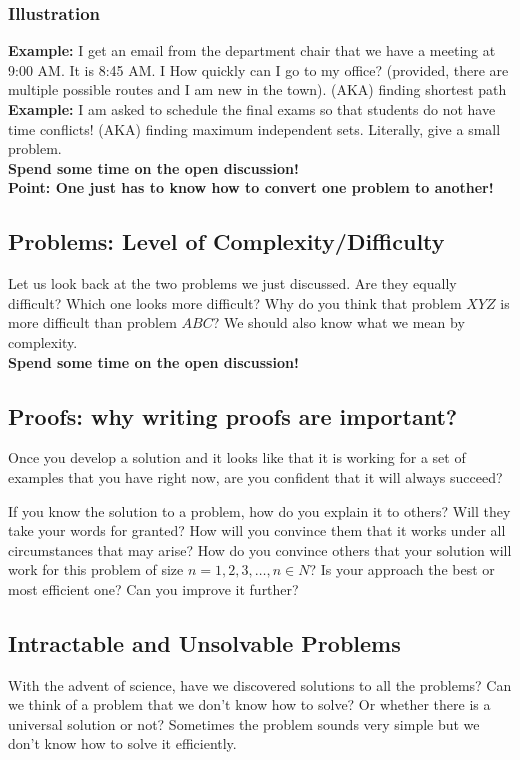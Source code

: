 \documentclass[11pt, oneside]{article}   	%
\begin{document}
\subsubsection{Illustration}
{\bf Example:} I get an email from the department chair that we have a meeting at 9:00 AM. It is 8:45 AM. I How quickly can I go to my office? (provided, there are multiple possible routes and I am new in the town).  
(AKA) finding shortest path\\

{\bf Example:} I am asked to schedule the final exams so that students do not have time conflicts!
(AKA) finding maximum independent sets. Literally, give a small problem.\\
{\bf Spend some time on the open discussion!}\\

{\bf Point: One just has to know how to convert one problem to another!}

\subsection{Problems: Level of Complexity/Difficulty}

Let us look back at the two problems we just discussed. Are they equally difficult? Which one looks more difficult?
Why do you think that problem $XYZ$ is more difficult than problem $ABC$? We should also know what we mean by {complexity}.\\
{\bf Spend some time on the open discussion!}

\subsection{Proofs: why writing proofs are important?}

Once you develop a solution and it looks like that it is working for a set of examples that you have right now, are you confident that it will always succeed? 
\par If you know the solution to a problem, how do you explain it to others? Will they take your words for granted? How will you convince them that it works under all circumstances that may arise? How do you convince others that your solution will work for this problem of size $n = 1, 2, 3, \dots, n\in N$? Is your approach the best or most efficient one? Can you improve it further?

\subsection{Intractable and Unsolvable Problems}
With the advent of science, have we discovered solutions to all the problems? Can we think of a problem that we don't know how to solve? Or whether there is a universal solution or not? Sometimes the problem sounds very simple but we don't know how to solve it efficiently. 
\end{document}
